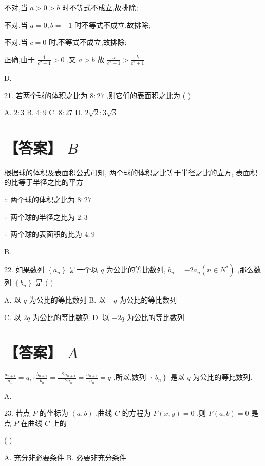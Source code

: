 \documentclass[10pt]{article}
\begin{document}
不对,当 \(a > 0 > b\) 时不等式不成立,故排除;

不对,当 \(a = 0,b =  - 1\) 时不等式不成立,故排除;

不对,当 \(c = 0\) 时,不等式不成立,故排除;

正确,由于 \(\frac{1}{{c}^{2} + 1} > 0\) ,又 \(a > b\) 故 \(\frac{a}{{c}^{2} + 1} > \frac{b}{{c}^{2} + 1}\)

D.

21. 若两个球的体积之比为 \(8 : {27}\) ,则它们的表面积之比为 ( )

A. \(2 : 3\) B. \(4 : 9\) C. \(8 : {27}\) D. \(2\sqrt{2} : 3\sqrt{3}\)

\section*{【答案】 \(B\)}

根据球的体积及表面积公式可知, 两个球的体积之比等于半径之比的立方, 表面积的比等于半径之比的平方

\(\because\) 两个球的体积之比为 \(8 : {27}\)

\(\therefore\) 两个球的半径之比为 \(2 : 3\)

\(\therefore\) 两个球的表面积的比为 \(4 : 9\)

B.

22. 如果数列 \(\left\{  {a}_{n}\right\}\) 是一个以 \(q\) 为公比的等比数列, \({b}_{n} =  - 2{a}_{n}\left( {n \in  {N}^{ * }}\right)\) ,那么数列 \(\left\{  {b}_{n}\right\}\) 是 ( )

A. 以 \(q\) 为公比的等比数列 B. 以 \(- q\) 为公比的等比数列

C. 以 \({2q}\) 为公比的等比数列 D. 以 \(- {2q}\) 为公比的等比数列

\section*{【答案】 \(A\)}

\(\frac{{a}_{n + 1}}{{a}_{n}} = q,\therefore \frac{{b}_{n + 1}}{{b}_{n}} = \frac{-2{a}_{n + 1}}{-2{a}_{n}} = \frac{{a}_{n + 1}}{{a}_{n}} = q\) ,所以,数列 \(\left\{  {b}_{n}\right\}\) 是以 \(q\) 为公比的等比数列.

A.

23. 若点 \(P\) 的坐标为 \(\left( {a,b}\right)\) ,曲线 \(C\) 的方程为 \(F\left( {x,y}\right)  = 0\) ,则 \(F\left( {a,b}\right)  = 0\) 是点 \(P\) 在曲线 \(C\) 上的

( )

A. 充分非必要条件 B. 必要非充分条件
\end{document}
